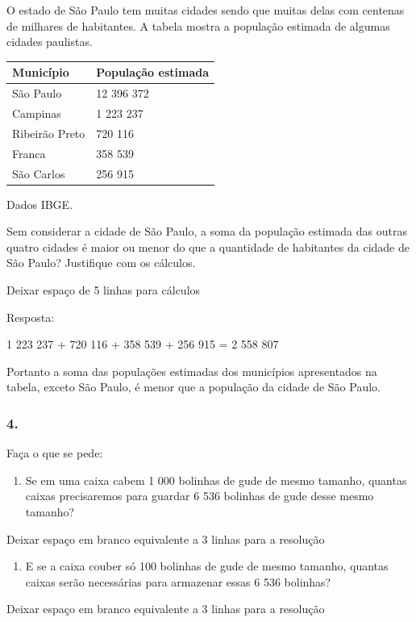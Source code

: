 O estado de São Paulo tem muitas cidades sendo que muitas delas com
centenas de milhares de habitantes. A tabela mostra a população estimada
de algumas cidades paulistas.

\begin{longtable}[]{@{}ll@{}}
\toprule
Município & População estimada\tabularnewline
\midrule
\endhead
São Paulo & 12 396 372\tabularnewline
Campinas & 1 223 237\tabularnewline
Ribeirão Preto & 720 116\tabularnewline
Franca & 358 539\tabularnewline
São Carlos & 256 915\tabularnewline
\bottomrule
\end{longtable}

Dados IBGE.

Sem considerar a cidade de São Paulo, a soma da população estimada das
outras quatro cidades é maior ou menor do que a quantidade de habitantes
da cidade de São Paulo? Justifique com os cálculos.

Deixar espaço de 5 linhas para cálculos

Resposta:

1 223 237 + 720 116 + 358 539 + 256 915 = 2 558 807

Portanto a soma das populações estimadas dos municípios apresentados na
tabela, exceto São Paulo, é menor que a população da cidade de São
Paulo.

\subsubsection{4.}\label{section-16}

Faça o que se pede:

\begin{enumerate}
\def\labelenumi{\alph{enumi})}
\item
  Se em uma caixa cabem 1 000 bolinhas de gude de mesmo tamanho, quantas
  caixas precisaremos para guardar 6 536 bolinhas de gude desse mesmo
  tamanho?
\end{enumerate}

Deixar espaço em branco equivalente a 3 linhas para a resolução

\begin{enumerate}
\def\labelenumi{\alph{enumi})}
\item
  E se a caixa couber só 100 bolinhas de gude de mesmo tamanho, quantas
  caixas serão necessárias para armazenar essas 6 536 bolinhas?
\end{enumerate}

Deixar espaço em branco equivalente a 3 linhas para a resolução


